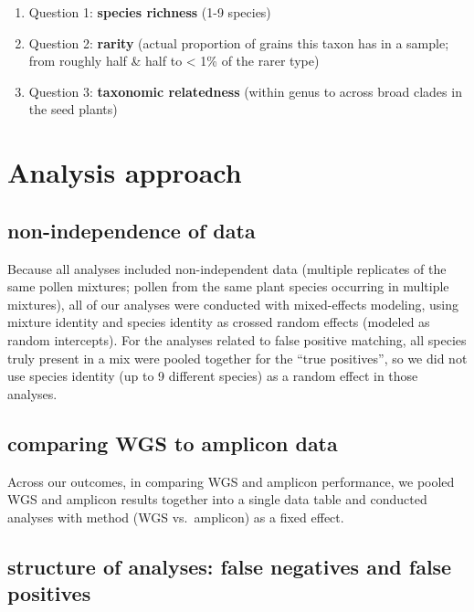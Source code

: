 \documentclass[
]{article}
\providecommand{\tightlist}{%
  \setlength{\itemsep}{0pt}\setlength{\parskip}{0pt}}
\begin{document}
\begin{enumerate}
\def\labelenumi{\arabic{enumi}.}
\tightlist
\item
  Question 1: \textbf{species richness} (1-9 species)
\item
  Question 2: \textbf{rarity} (actual proportion of grains this taxon
  has in a sample; from roughly half \& half to \textless{} 1\% of the
  rarer type)
\item
  Question 3: \textbf{taxonomic relatedness} (within genus to across
  broad clades in the seed plants)
\end{enumerate}

\hypertarget{analysis-approach}{%
\section{Analysis approach}\label{analysis-approach}}

\hypertarget{non-independence-of-data}{%
\subsection{non-independence of data}\label{non-independence-of-data}}

Because all analyses included non-independent data (multiple replicates
of the same pollen mixtures; pollen from the same plant species
occurring in multiple mixtures), all of our analyses were conducted with
mixed-effects modeling, using mixture identity and species identity as
crossed random effects (modeled as random intercepts). For the analyses
related to false positive matching, all species truly present in a mix
were pooled together for the ``true positives'', so we did not use
species identity (up to 9 different species) as a random effect in those
analyses.

\hypertarget{comparing-wgs-to-amplicon-data}{%
\subsection{comparing WGS to amplicon
data}\label{comparing-wgs-to-amplicon-data}}

Across our outcomes, in comparing WGS and amplicon performance, we
pooled WGS and amplicon results together into a single data table and
conducted analyses with method (WGS vs.~amplicon) as a fixed effect.

\hypertarget{structure-of-analyses-false-negatives-and-false-positives}{%
\subsection{structure of analyses: false negatives and false
positives}\label{structure-of-analyses-false-negatives-and-false-positives}}
\end{document}
